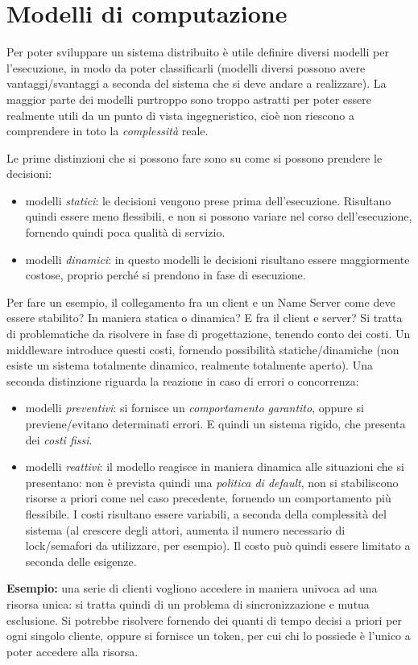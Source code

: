 \chapter{Modelli di computazione}
Per poter sviluppare un sistema distribuito è utile definire diversi modelli per
l'esecuzione, in modo da poter classificarli (modelli diversi possono avere
vantaggi/svantaggi a seconda del sistema che si deve andare a realizzare).
La maggior parte dei modelli purtroppo sono troppo astratti per poter essere
realmente utili da un punto di vista ingegneristico, cioè non riescono a
comprendere in toto la \textit{complessità} reale.

Le prime distinzioni che si possono fare sono su come si possono prendere le decisioni:
\begin{itemize}
 \item modelli \textit{statici}: le decisioni vengono prese prima
 dell'esecuzione. Risultano quindi essere meno flessibili, e non si possono
variare nel corso dell'esecuzione, fornendo quindi poca qualità di servizio.
\item modelli \textit{dinamici}: in questo modelli le decisioni risultano
essere maggiormente costose, proprio perché si prendono in fase di
esecuzione.
\end{itemize}
Per fare un esempio, il collegamento fra un client e un Name Server come deve
essere stabilito? In maniera statica o dinamica? E fra il client e server? Si
tratta di problematiche da risolvere in fase di progettazione, tenendo conto
dei costi. Un middleware introduce questi costi, fornendo possibilità
statiche/dinamiche (non esiste un sistema totalmente dinamico, realmente
totalmente aperto).
Una seconda distinzione riguarda la reazione in caso di errori o concorrenza:
\begin{itemize}
 \item modelli \textit{preventivi}: si fornisce un \textit{comportamento
 garantito}, oppure si previene/evitano determinati errori. E quindi un sistema
rigido, che presenta dei \textit{costi fissi}.
\item modelli \textit{reattivi}: il modello reagisce in maniera dinamica alle
situazioni che si presentano: non è prevista quindi una \textit{politica di
default}, non si stabiliscono risorse a priori come nel caso precedente,
fornendo un comportamento più flessibile. I costi risultano essere variabili, a
seconda della complessità del sistema (al crescere degli attori, aumenta il
numero necessario di lock/semafori da utilizzare, per esempio). Il costo può
quindi essere limitato a seconda delle esigenze.
\end{itemize}
\textbf{Esempio:} una serie di clienti vogliono accedere in maniera univoca ad
una risorsa unica: si tratta quindi di un problema di sincronizzazione e mutua 
esclusione. Si potrebbe risolvere fornendo dei quanti di tempo decisi a priori 
per ogni singolo cliente, oppure si fornisce un token, per cui chi lo possiede è 
l'unico a poter accedere alla risorsa.

